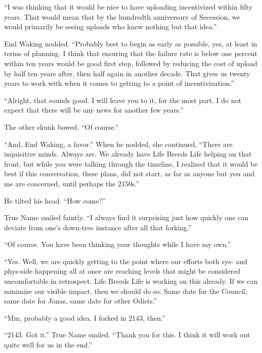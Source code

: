 ``I was thinking that it would be nice to have uploading incentivized within fifty years. That would mean that by the hundredth anniversary of Secession, we would primarily be seeing uploads who knew nothing but that idea.''

End Waking nodded. ``Probably best to begin as early as possible, yes, at least in terms of planning. I think that ensuring that the failure rate is below one percent within ten years would be good first step, followed by reducing the cost of upload by half ten years after, then half again in another decade. That gives us twenty years to work with when it comes to getting to a point of incentivization.''

``Alright, that sounds good. I will leave you to it, for the most part. I do not expect that there will be any news for another few years.''

The other skunk bowed. ``Of course.''

``And, End Waking, a favor.'' When he nodded, she continued, ``There are inquisitive minds. Always are. We already have Life Breeds Life helping on that front, but while you were talking through the timeline, I realized that it would be best if this conversation, these plans, did not start, as far as anyone but you and me are concerned, until perhaps the 2150s.''

He tilted his head. ``How come?''

True Name smiled faintly. ``I always find it surprising just how quickly one can deviate from one's down-tree instance after all that forking.''

``Of course. You have been thinking your thoughts while I have my own.''

``Yes. Well, we are quickly getting to the point where our efforts both sys- and phys-side happening all at once are reaching levels that might be considered uncomfortable in retrospect. Life Breeds Life is working on this already. If we can minimize our visible impact, then we should do so. Same date for the Council, same date for Jonas, same date for other Odists.''

``Mm, probably a good idea. I forked in 2143, then.''

``2143. Got it.'' True Name smiled. ``Thank you for this. I think it will work out quite well for us in the end.''
